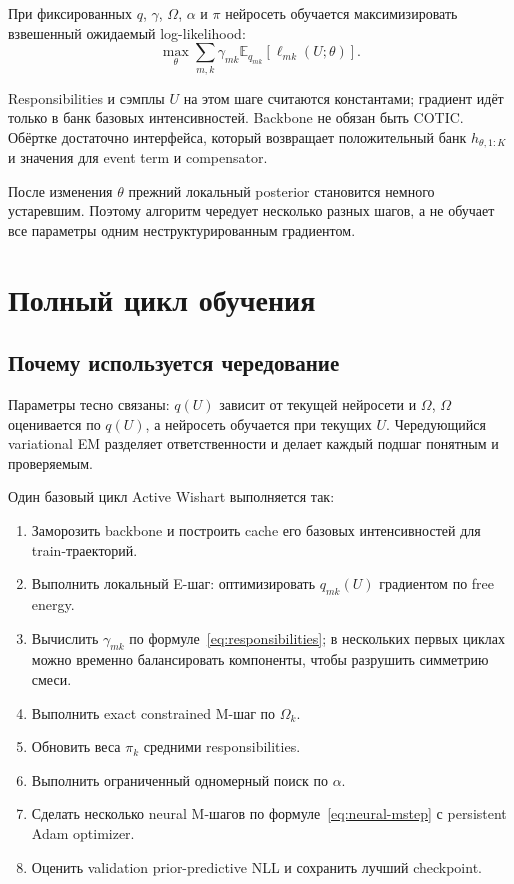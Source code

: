 \documentclass[12pt,a4paper]{article}
\newcommand{\E}{\mathbb{E}}
\begin{document}
При фиксированных \(q\), \(\gamma\), \(\Omega\), \(\alpha\) и \(\pi\) нейросеть обучается максимизировать взвешенный ожидаемый log-likelihood:
\begin{equation}
\max_{\theta}\sum_{m,k}\gamma_{mk}\E_{q_{mk}}\left[\ell_{mk}(U;\theta)\right].
\label{eq:neural-mstep}
\end{equation}

Responsibilities и сэмплы \(U\) на этом шаге считаются константами; градиент идёт только в банк базовых интенсивностей. Backbone не обязан быть COTIC. Обёртке достаточно интерфейса, который возвращает положительный банк \(h_{\theta,1:K}\) и значения для event term и compensator.

После изменения \(\theta\) прежний локальный posterior становится немного устаревшим. Поэтому алгоритм чередует несколько разных шагов, а не обучает все параметры одним неструктурированным градиентом.

\section{Полный цикл обучения}

\subsection{Почему используется чередование}

Параметры тесно связаны: \(q(U)\) зависит от текущей нейросети и \(\Omega\), \(\Omega\) оценивается по \(q(U)\), а нейросеть обучается при текущих \(U\). Чередующийся variational EM разделяет ответственности и делает каждый подшаг понятным и проверяемым.

Один базовый цикл Active Wishart выполняется так:
\begin{enumerate}
\item Заморозить backbone и построить cache его базовых интенсивностей для train-траекторий.
\item Выполнить локальный E-шаг: оптимизировать \(q_{mk}(U)\) градиентом по free energy.
\item Вычислить \(\gamma_{mk}\) по формуле~\eqref{eq:responsibilities}; в нескольких первых циклах можно временно балансировать компоненты, чтобы разрушить симметрию смеси.
\item Выполнить exact constrained M-шаг по \(\Omega_k\).
\item Обновить веса \(\pi_k\) средними responsibilities.
\item Выполнить ограниченный одномерный поиск по \(\alpha\).
\item Сделать несколько neural M-шагов по формуле~\eqref{eq:neural-mstep} с persistent Adam optimizer.
\item Оценить validation prior-predictive NLL и сохранить лучший checkpoint.
\end{enumerate}
\end{document}
